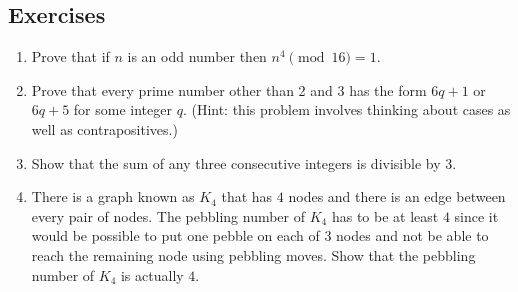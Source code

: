 \documentclass[10pt,]{book}
\theoremstyle{plain}
\theoremstyle{definition}
\theoremstyle{definition}
\numberwithin{equation}{section}
\newcommand{\hint}[1]{ }
\begin{document}
\subsection[{Exercises}]{Exercises}\label{exercises-19}
\leavevmode%
\begin{enumerate}[label=(\alph*)]
\item\hypertarget{li-276}{}
          Prove that if \(n\) is an odd number then \(n^4 \pmod{16} = 1\).

          \hint{

          While one could perform fairly complicated arithmetic, expanding expression like
          \((16k+13)^4\) and then regrouping to put it in the form \(16q+1\) (and one would need 
          to do that work for each of the odd remainders modulo \(16\)),  that would be missing out
          on the true power of modular notation.  In a ``\(\pmod{16}\)'' calculation one can simply ignore
          summands like \(16k\) because they are \(0 \pmod{16}\).  Thus, for example,
          \begin{equation*}
            (16k+7)^4 \pmod{16} \; = \; 7^4 \pmod{16} \; = \; 2401 \pmod{16}  \; = \; 1.
          \end{equation*}
          So, essentially one just needs to compute the \(4\)th powers of \(1, 3, 5, 7, 9, 11, 13\)  and \(15\), and
          then reduce them modulo 16.  An even greater economy is possible if one notes that (modulo 16) many
          of those cases are negatives of one another \textemdash{} so their \(4\)th powers are equal.
          }
\item\hypertarget{li-277}{}
          Prove that every prime number other than 2 and 3 has the form
          \(6q+1\) or \(6q+5\) for some integer \(q\).  (Hint: this problem involves
          thinking about cases as well as contrapositives.)

          \hint{It is probably obvious that the "cases" will be the possible remainders mod 6. Numbers of the form 6q+0 will be multiples of 6, so clearly not prime. The other forms that need to be eliminated are 6q+2, 6q+3, and 6q+4.
          }
\item\hypertarget{li-278}{}
          Show that the sum of any three consecutive integers is divisible
          by 3.

          \hint{Write the sum as \(n + (n+1) + (n+2)\).}
\item\hypertarget{li-279}{}
          There is a graph known as \(K_4\) that has \(4\) nodes and there is an edge between every pair of nodes.
          The pebbling number of \(K_4\) has to be at least \(4\) since it would be possible to put one pebble on each of
          \(3\) nodes and not be able to reach the remaining node using pebbling moves.  Show that the pebbling number of \(K_4\) is actually \(4\).


\end{enumerate}
\end{document}
